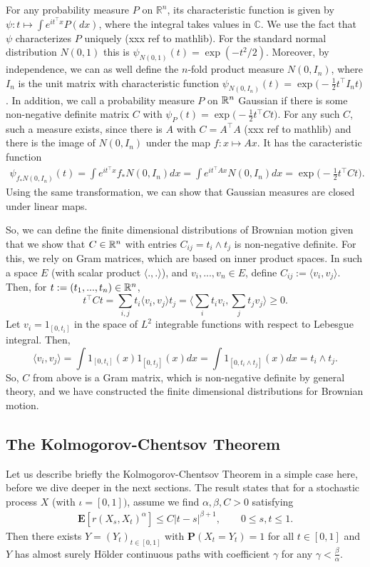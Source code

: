 \documentclass[lean]{AFM}
\begin{document}
For any probability measure $P$ on $\mathbb R^n$, its characteristic function is given by $\psi: t \mapsto \int e^{it^\top x} P(dx)$, where the integral takes values in $\mathbb C$. We use the fact that $\psi$ characterizes $P$ uniquely (xxx ref to mathlib). For the standard normal distribution $N(0,1)$ this is $\psi_{N(0,1)}(t) = \exp(-t^2/2)$. Moreover, by independence, we can as well define the $n$-fold product measure $N(0, I_n)$, where $I_n$ is the unit matrix with characteristic function $\psi_{N(0,I_n)}(t) = \exp\big(-\tfrac 12 t^\top I_n t\big)$. In addition, we call a probability measure $P$ on $\mathbb{R}^n$ Gaussian if there is some non-negative definite matrix $C$ with $\psi_P(t) = \exp\big( - \tfrac 12 t^\top C t\big)$. For any such $C$, such a measure exists, since there is $A$ with $C = A^\top A$ (xxx ref to mathlib) and there is the image of $N(0,I_n)$ under the map $f : x\mapsto Ax$. It has the caracteristic function
\begin{align} \label{eq:gausslin}
\psi_{f_\ast N(0,I_n)}(t) = \int e^{it^\top x} f_\ast N(0,I_n) dx = \int e^{it^\top A x} N(0,I_n) dx = \exp\big( - \tfrac 12 t^\top C t\big).
\end{align}
Using the same transformation, we can show that Gaussian measures are closed under linear maps.

So, we can define the finite dimensional distributions of Brownian motion given that we show that $C \in \mathbb{R}^n$ with entries $C_{ij} = t_i \wedge t_j$ is non-negative definite. For this, we rely on Gram matrices, which are based on inner product spaces. In such a space $E$ (with scalar product $\langle .,. \rangle$), and $v_i,...,v_n \in E$, define $C_{ij} := \langle v_i, v_j\rangle$. Then, for $t :=(t_1,...,t_n) \in \mathbb{R}^n$,
$$ t^\top C t = \sum_{i,j} t_i \langle v_i, v_j\rangle t_j = \Big\langle \sum_i t_i v_i, \sum_j t_j v_j\Big\rangle \geq 0.$$
Let $v_i = 1_{[0,t_i]}$ in the space of $L^2$ integrable functions with respect to Lebesgue integral. Then,
$$ \langle v_i, v_j \rangle = \int 1_{[0,t_i]}(x) 1_{[0,t_j]}(x) dx = \int 1_{[0,t_i \wedge t_j]}(x) dx = t_i \wedge t_j.$$
So, $C$ from above is a Gram matrix, which is non-negative definite by general theory, and we have constructed the finite dimensional distributions for Brownian motion.

\cite{hairer2009introduction}

\subsection{The Kolmogorov-Chentsov Theorem}
Let us describe briefly the Kolmogorov-Chentsov Theorem in a simple case here, before we dive deeper in the next sections. The result states that for a stochastic process $X$ (with $\iota = [0,1])$, assume we find $\alpha, \beta, C > 0$ satisfying
\begin{align}
\label{eq:cs}
  \mathbf E[r(X_s, X_t)^\alpha] \leq C|t-s|^{\beta + 1}, \qquad 0\leq s,t\leq 1.
\end{align}
Then there exists $Y = (Y_t)_{t\in [0,1]}$ with $\mathbf P(X_t = Y_t) = 1$ for all $t\in [0,1]$ and $Y$ has almost surely Hölder continuous paths with coefficient $\gamma$ for any $\gamma < \tfrac \beta \alpha$.
\end{document}
